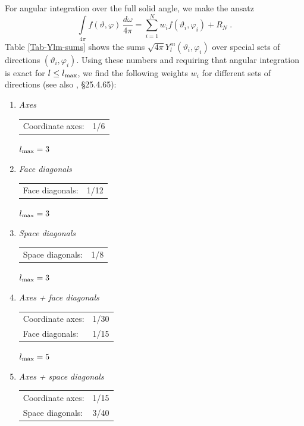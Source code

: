 \documentclass[\mydriver,12pt,twoside,notitlepage,a4paper]{article}
\begin{document}
For angular integration over the full solid angle, we make the ansatz
\begin{equation}
  \int\limits_{4\pi} f(\vartheta,\varphi)\,\frac{d\omega}{4\pi}
  = \sum_{i=1}^{N} w_i f(\vartheta_i,\varphi_i) + R_N \; .
\end{equation}
Table \ref{Tab-Ylm-sums} shows the sums
$\sqrt{4\pi}Y_l^m(\vartheta_i,\varphi_i)$ over special sets of directions
$(\vartheta_i,\varphi_i)$.
Using these numbers and requiring that angular integration is exact for
$l\le l_{\rm max}$, we find the following weights $w_i$ for different sets
of directions (see also \cite{Abramowitz-Stegun}, \S 25.4.65):

\begin{enumerate}
\item \emph{Axes}

  \begin{tabular}{@{}lr}
    Coordinate axes: & 1/6
  \end{tabular}

  $l_{\rm max} = 3$

\item \emph{Face diagonals}

  \begin{tabular}{@{}lr}
    Face diagonals: & 1/12
  \end{tabular}

  $l_{\rm max} = 3$

\item \emph{Space diagonals}

  \begin{tabular}{@{}lr}
    Space diagonals: & 1/8
  \end{tabular}

  $l_{\rm max} = 3$

\item \emph{Axes + face diagonals}

  \begin{tabular}{@{}lr}
    Coordinate axes: & 1/30 \\
    Face diagonals:  & 1/15 \\
  \end{tabular}

  $l_{\rm max} = 5$

\item \emph{Axes + space diagonals}

  \begin{tabular}{@{}lr}
    Coordinate axes: & 1/15 \\
    Space diagonals: & 3/40 \\
  \end{tabular}


\end{enumerate}
\end{document}
